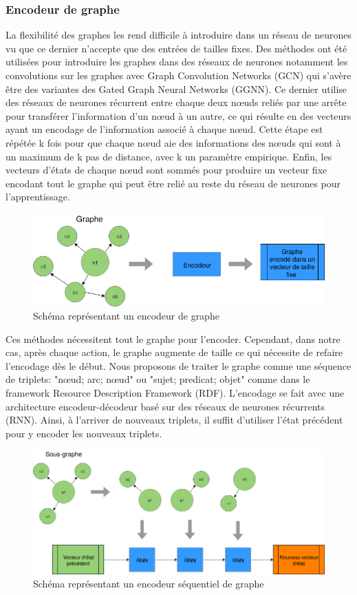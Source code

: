 \subsubsection*{Encodeur de graphe}
La flexibilité des graphes les rend difficile à introduire dans un réseau de neurones vu que ce dernier n'accepte que des entrées de tailles fixes. Des méthodes ont été utilisées pour introduire les graphes dans des réseaux de neurones notamment les convolutions sur les graphes avec Graph Convolution Networks (GCN)\cite{KipfW17} qui s'avère être des variantes des Gated Graph Neural Networks (GGNN)\cite{Li2016GatedGS}. Ce dernier utilise des réseaux de neurones récurrent entre chaque deux n\oe{}uds reliés par une arrête pour transférer l'information d'un n\oe{}ud à un autre, ce qui résulte en des vecteurs ayant un encodage de l'information associé à chaque n\oe{}ud. Cette étape est répétée k fois pour que chaque n\oe{}ud aie des informations des n\oe{}uds qui sont à un maximum de k pas de distance, avec k un paramètre empirique. Enfin, les vecteurs d'états de chaque n\oe{}ud sont sommés pour produire un vecteur fixe encodant tout le graphe qui peut être relié au reste du réseau de neurones pour l'apprentissage.
\begin{figure}[H] 
	\centering
	\includegraphics[width=0.8\linewidth]{images/Conception/DM/encoder.png}
	\caption{Schéma représentant un encodeur de graphe}
	
\end{figure}\label{encoder}
Ces méthodes nécessitent tout le graphe pour l'encoder. Cependant, dans notre cas, après chaque action, le graphe augmente de taille ce qui nécessite de refaire l'encodage dès le début. Nous proposons de traiter le graphe comme une séquence de triplets: "n\oe{}ud; arc; n\oe{}ud" ou "sujet; predicat; objet" comme dans le framework Resource Description Framework (RDF). L'encodage se fait avec une architecture encodeur-décodeur basé sur des réseaux de neurones récurrents (RNN). Ainsi, à l'arriver de nouveaux triplets, il suffit d'utiliser l'état précédent pour y encoder les nouveaux triplets.
\begin{figure}[H] 
	\centering
	\includegraphics[width=0.8\linewidth]{images/Conception/DM/encoder_seq.png}
	\caption{Schéma représentant un encodeur séquentiel de graphe}
	
\end{figure}\label{encoder_seq}
